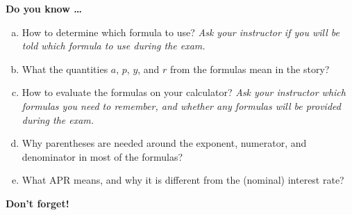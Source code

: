 \newpage



\bigskip

\noindent \textbf{Do you know \ldots} %

\begin{enumerate} [(a)]
\item How to determine which formula to use? \emph{Ask your instructor if you will be told which formula to use during the exam.}  
\item What the quantities $a$, $p$, $y$, and $r$ from the formulas mean in the story? 
\item How to evaluate the formulas on your calculator?  \emph{Ask your instructor which formulas you need to remember, and whether any formulas will be provided during the exam.}
\item Why parentheses are needed around the exponent, numerator, and denominator in most of the formulas? 
\item What APR means, and why it is different from the (nominal) interest rate? 
\end{enumerate}

\bigskip

\noindent \textbf{Don't forget!}
